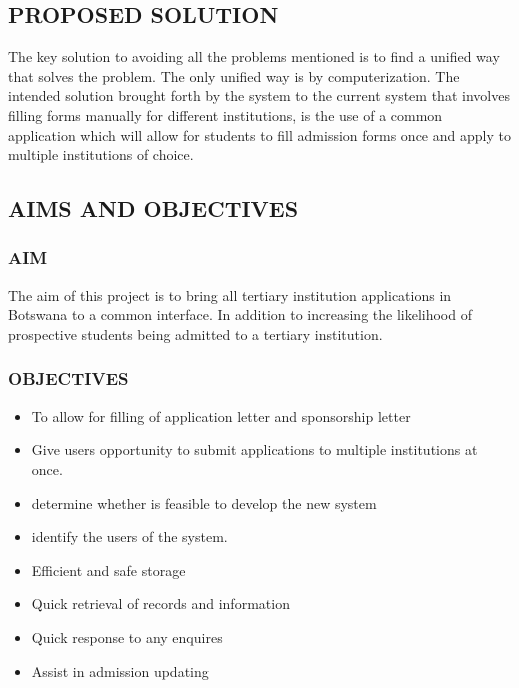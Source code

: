 \subsection{PROPOSED SOLUTION}
The key solution to avoiding all the problems mentioned is to find a unified way that solves the problem. The only unified way is by computerization. The intended solution brought forth by the system to the current system that involves filling forms manually for different institutions, is the use of a common application which will allow for students to fill admission forms once and apply to multiple institutions of choice.

\subsection{AIMS AND OBJECTIVES}
\subsubsection{AIM}
The aim of this project is to bring all tertiary institution applications in Botswana to a common interface. In addition to increasing the likelihood of prospective students being admitted to a tertiary institution.

\subsubsection{OBJECTIVES}
\begin{itemize}
	\item To allow for filling of application letter and sponsorship letter
	\item Give users opportunity to submit applications to multiple institutions at once.
	\item determine whether is feasible to develop the new system
	\item identify the users of the system.
	\item Efficient and safe storage
	\item Quick retrieval of records and information
	\item Quick response to any enquires
	\item Assist in admission updating

\end{itemize}

